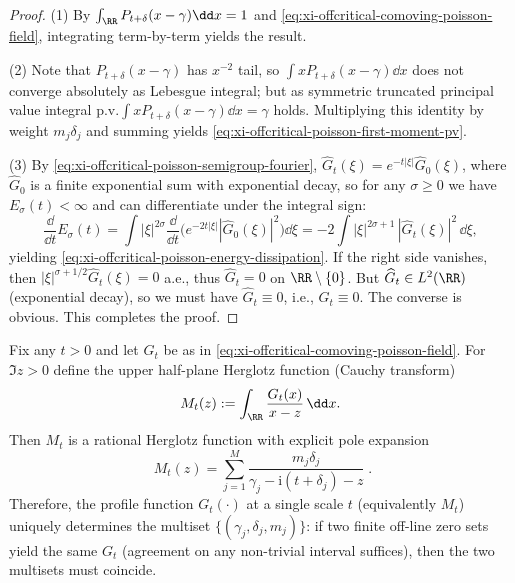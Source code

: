 \begin{proof}
(1) By \(\int_{\RR}P_{t+\delta}(x-\gamma)\dd x=1\) and \eqref{eq:xi-offcritical-comoving-poisson-field}, integrating term-by-term yields the result.
\par
(2) Note that \(P_{t+\delta}(x-\gamma)\) has \(x^{-2}\) tail, so \(\int xP_{t+\delta}(x-\gamma)\dd x\) does not converge absolutely as Lebesgue integral; but as symmetric truncated principal value integral
\(
\mathrm{p.v.}\int xP_{t+\delta}(x-\gamma)\dd x=\gamma
\) holds.
Multiplying this identity by weight \(m_j\delta_j\) and summing yields \eqref{eq:xi-offcritical-poisson-first-moment-pv}.
\par
(3) By \eqref{eq:xi-offcritical-poisson-semigroup-fourier}, \(\widehat G_t(\xi)=e^{-t|\xi|}\widehat G_0(\xi)\), where \(\widehat G_0\) is a finite exponential sum with exponential decay, so for any \(\sigma\ge 0\) we have \(E_\sigma(t)<\infty\) and can differentiate under the integral sign:
\[
\frac{\dd}{\dd t}E_\sigma(t)
=\int |\xi|^{2\sigma}\frac{\dd}{\dd t}\bigl(e^{-2t|\xi|}|\widehat G_0(\xi)|^2\bigr)\dd\xi
=-2\int |\xi|^{2\sigma+1}\,|\widehat G_t(\xi)|^2\,\dd\xi,
\]
yielding \eqref{eq:xi-offcritical-poisson-energy-dissipation}.
If the right side vanishes, then \( |\xi|^{\sigma+1/2}\widehat G_t(\xi)=0\) a.e., thus \(\widehat G_t=0\) on \(\RR\setminus\{0\}\).
But \(\widehat G_t\in L^2(\RR)\) (exponential decay), so we must have \(\widehat G_t\equiv 0\), i.e., \(G_t\equiv 0\).
The converse is obvious. This completes the proof.
\end{proof}

\begin{theorem}\label{thm:xi-offcritical-poisson-herglotz-inversion}
Fix any \(t>0\) and let \(G_t\) be as in \eqref{eq:xi-offcritical-comoving-poisson-field}.
For \(\Im z>0\) define the upper half-plane Herglotz function (Cauchy transform)
\[
M_t(z):=\int_{\RR}\frac{G_t(x)}{x-z}\,\dd x.
\]
Then \(M_t\) is a rational Herglotz function with explicit pole expansion
\begin{equation}\label{eq:xi-offcritical-poisson-herglotz-poles}
\boxed{\;
M_t(z)
=\sum_{j=1}^{M}\frac{m_j\delta_j}{\gamma_j-\mathrm{i}(t+\delta_j)-z}
\; }.
\end{equation}
Therefore, the profile function \(G_t(\cdot)\) at a single scale \(t\) (equivalently \(M_t\)) uniquely determines the multiset \(\{(\gamma_j,\delta_j,m_j)\}\): if two finite off-line zero sets yield the same \(G_t\) (agreement on any non-trivial interval suffices), then the two multisets must coincide.
\end{theorem}

